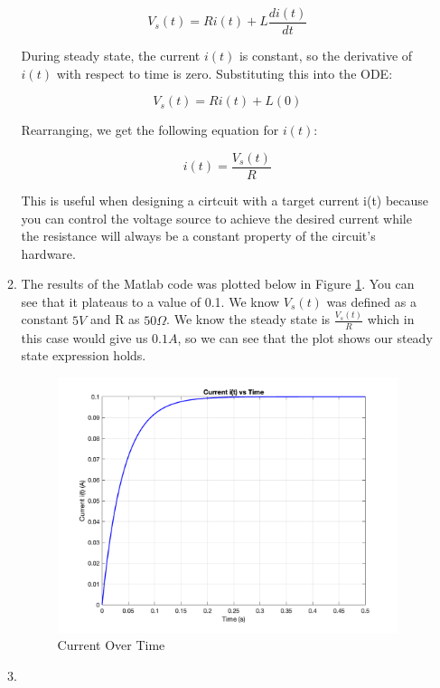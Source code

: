 \documentclass[12pt]{article}
\begin{document}
\begin{enumerate}
\begin{enumerate}
    \[
    V_s(t) = Ri(t) + L\frac{di(t)}{dt}
    \]

    During steady state, the current \( i(t) \) is constant, so the derivative of \( i(t) \) with respect to time is zero. Substituting this into the ODE:

    \[
    V_s(t) = Ri(t) + L(0)
    \]

    Rearranging, we get the following equation for $i(t)$:

    \[
    i(t) = \frac{V_s(t)}{R}
    \]

    This is useful when designing a cirtcuit with a target current i(t) because you can control the voltage source to achieve the desired current while the resistance will always be a constant property of the circuit's hardware. 

  \item 
    The results of the Matlab code was plotted below in Figure \ref{fig:figure32}. You can see that it plateaus to a value of 0.1. We know $V_s(t)$ was defined as a constant $5 V$ and R as $50 \Omega$. We know the steady state is $\frac{V_s(t)}{R}$ which in this case would give us $0.1 A$, so we can see that the plot shows our steady state expression holds.

    \begin{figure}[H]
      \centering
      \includegraphics[width=\textwidth]{Figures/figure32.png}
      \caption{Current Over Time}
      \label{fig:figure32}
    \end{figure}

  \item 
    

\end{enumerate}
\end{enumerate}
\end{document}
